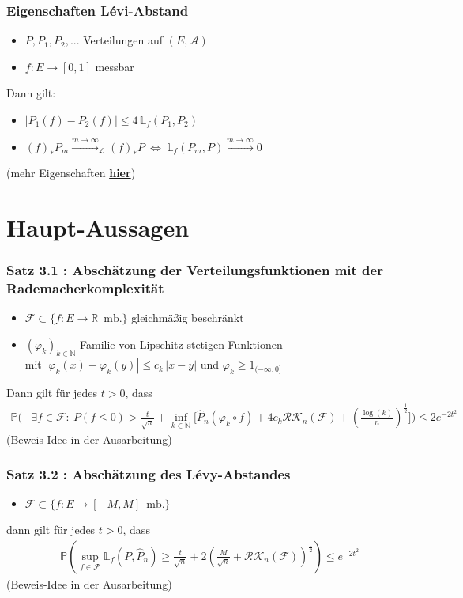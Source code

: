 \documentclass{beamer}
\newcommand{\R}{\mathbb{R}} %
\newcommand{\N}{\mathbb{N}} %
\newcommand{\F}{\mathcal{F}}
\begin{document}
	\begin{frame}
		\frametitle{Eigenschaften L\'evi-Abstand}
		\begin{itemize}
			\item $P,P_1,P_2,...$ Verteilungen auf $(E,\mathcal{A})$
			\item $f : E \rightarrow [0,1]$ messbar
		\end{itemize}
		\hfill\break
		Dann gilt:
		\begin{itemize}
			\item $\left| P_1(f) - P_2(f) \right| \leq 4 \, \mathbb{L}_f(P_1,P_2)$
			\item $(f)_*P_m \xrightarrow{m \rightarrow \infty}_{\mathcal{L}} (f)_*P \ \Leftrightarrow \ \mathbb{L}_f(P_m,P) \xrightarrow{m \rightarrow \infty} 0 $
		\end{itemize}
		\hfill\break
		(mehr Eigenschaften \href{https://encyclopediaofmath.org/wiki/Lévy_metric}{\textbf{hier}})
	\end{frame}
	
	
	\section{Haupt-Aussagen}
	
	\begin{frame}
		\frametitle{Satz 3.1 : Abschätzung der Verteilungsfunktionen mit der Rademacherkomplexität}
		\begin{itemize}
			\item $\F \subset \{f : E \rightarrow \R \, \text{ mb.}\}$ gleichmäßig beschränkt
			\item $(\varphi_k)_{k \in \N}$ Familie von Lipschitz-stetigen Funktionen\\
			mit $|\varphi_k(x)-\varphi_k(y)| \leq c_k \, |x-y|$ und $\varphi_k \geq 1_{(-\infty,0]}$
		\end{itemize}
		Dann gilt für jedes $t > 0$, dass
		{\footnotesize
		\begin{align*}
		\mathbb{P} \bigg( &\exists f \in \F : \ P(f \leq 0) > \frac{t}{\sqrt{n}} +  \inf\limits_{k \in \N} \bigg[ \hat{P}_n(\varphi_k \circ f) + 4 c_k \mathcal{RK}_n(\F) + \left( \frac{\log(k)}{n} \right)^{\frac{1}{2}} \bigg] \bigg) \leq 2 e^{-2t^2}
		\end{align*}
		}
		(Beweis-Idee in der Ausarbeitung)
	\end{frame}

	\begin{frame}
		\frametitle{Satz 3.2 : Abschätzung des L\'evy-Abstandes}
		\begin{itemize}
			\item $\F \subset \{f : E \rightarrow [-M,M] \, \text{ mb.}\}$
		\end{itemize}
		dann gilt für jedes $t > 0$, dass
		\begin{align*}
		& \mathbb{P}\left( \sup\limits_{f \in \F} \mathbb{L}_f(P, \hat{P}_n) \geq \frac{t}{\sqrt{n}} + 2\left(\frac{M}{\sqrt{n}} + \mathcal{RK}_n(\F)\right)^{\frac{1}{2}} \right) \leq e^{-2t^2}
		\end{align*}
		(Beweis-Idee in der Ausarbeitung)
	\end{frame}
\end{document}
